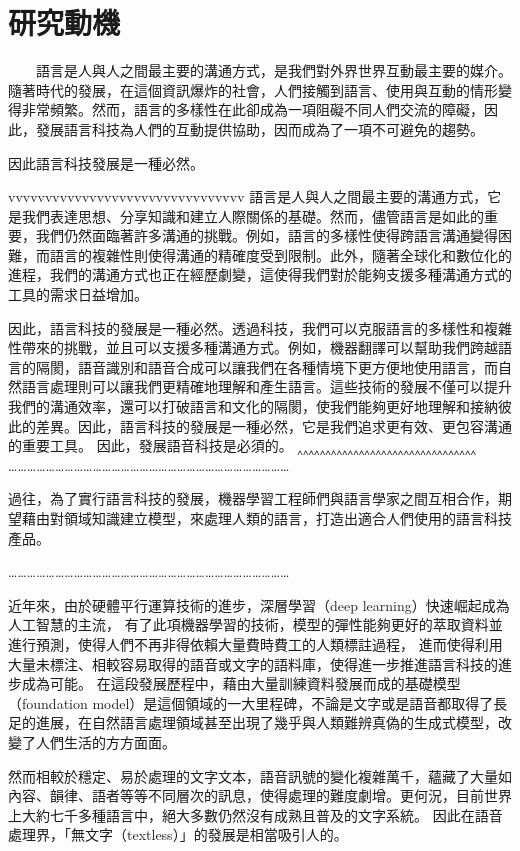 \section{研究動機}
　　語言是人與人之間最主要的溝通方式，是我們對外界世界互動最主要的媒介。隨著時代的發展，在這個資訊爆炸的社會，人們接觸到語言、使用與互動的情形變得非常頻繁。然而，語言的多樣性在此卻成為一項阻礙不同人們交流的障礙，因此，發展語言科技為人們的互動提供協助，因而成為了一項不可避免的趨勢。
  
  
  因此語言科技發展是一種必然。

    vvvvvvvvvvvvvvvvvvvvvvvvvvvvvvvv
    語言是人與人之間最主要的溝通方式，它是我們表達思想、分享知識和建立人際關係的基礎。然而，儘管語言是如此的重要，我們仍然面臨著許多溝通的挑戰。例如，語言的多樣性使得跨語言溝通變得困難，而語言的複雜性則使得溝通的精確度受到限制。此外，隨著全球化和數位化的進程，我們的溝通方式也正在經歷劇變，這使得我們對於能夠支援多種溝通方式的工具的需求日益增加。

    因此，語言科技的發展是一種必然。透過科技，我們可以克服語言的多樣性和複雜性帶來的挑戰，並且可以支援多種溝通方式。例如，機器翻譯可以幫助我們跨越語言的隔閡，語音識別和語音合成可以讓我們在各種情境下更方便地使用語言，而自然語言處理則可以讓我們更精確地理解和產生語言。這些技術的發展不僅可以提升我們的溝通效率，還可以打破語言和文化的隔閡，使我們能夠更好地理解和接納彼此的差異。因此，語言科技的發展是一種必然，它是我們追求更有效、更包容溝通的重要工具。
    因此，發展語音科技是必須的。
    ‸‸‸‸‸‸‸‸‸‸‸‸‸‸‸‸‸‸‸‸‸‸‸‸‸‸‸‸‸‸‸‸
    ………………………………………………………………………………

    過往，為了實行語言科技的發展，機器學習工程師們與語言學家之間互相合作，期望藉由對領域知識建立模型，來處理人類的語言，打造出適合人們使用的語言科技產品。

    ………………………………………………………………………………

    近年來，由於硬體平行運算技術的進步，深層學習（deep learning）快速崛起成為人工智慧的主流，
有了此項機器學習的技術，模型的彈性能夠更好的萃取資料並進行預測，使得人們不再非得依賴大量費時費工的人類標註過程，
進而使得利用大量未標注、相較容易取得的語音或文字的語料庫，使得進一步推進語言科技的進步成為可能。
在這段發展歷程中，藉由大量訓練資料發展而成的基礎模型（foundation model）是這個領域的一大里程碑，不論是文字或是語音都取得了長足的進展，在自然語言處理領域甚至出現了幾乎與人類難辨真偽的生成式模型，改變了人們生活的方方面面。

    然而相較於穩定、易於處理的文字文本，語音訊號的變化複雜萬千，蘊藏了大量如內容、韻律、語者等等不同層次的訊息，使得處理的難度劇增。更何況，目前世界上大約七千多種語言中，絕大多數仍然沒有成熟且普及的文字系統。
因此在語音處理界，「無文字（textless）」的發展是相當吸引人的。

